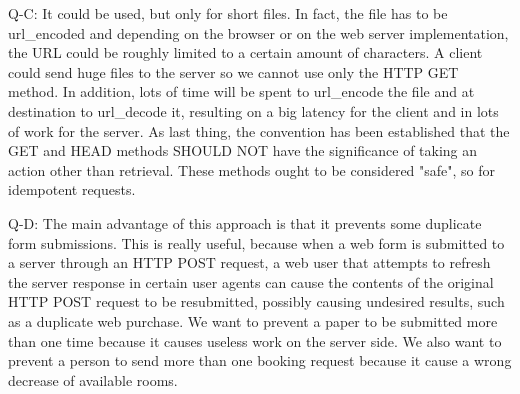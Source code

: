 Q-C: It could be used, but only for short files. In fact, the file has to be url_encoded and depending on the browser or on the web server implementation, the URL could be roughly limited to a certain amount of characters. A client could send huge files to the server so we cannot use only the HTTP GET method. In addition, lots of time will be spent to url_encode the file and at destination to url_decode it, resulting on a big latency for the client and in lots of work for the server. As last thing, the convention has been established that the GET and HEAD methods SHOULD NOT have the significance of taking an action other than retrieval. These methods ought to be considered "safe", so for idempotent requests.

Q-D: The main advantage of this approach is that it prevents some duplicate form submissions. This is really useful, because when a web form is submitted to a server through an HTTP POST request, a web user that attempts to refresh the server response in certain user agents can cause the contents of the original HTTP POST request to be resubmitted, possibly causing undesired results, such as a duplicate web purchase. We want to prevent a paper to be submitted more than one time because it causes useless work on the server side. We also want to prevent a person to send more than one booking request because it cause a wrong decrease of available rooms.


